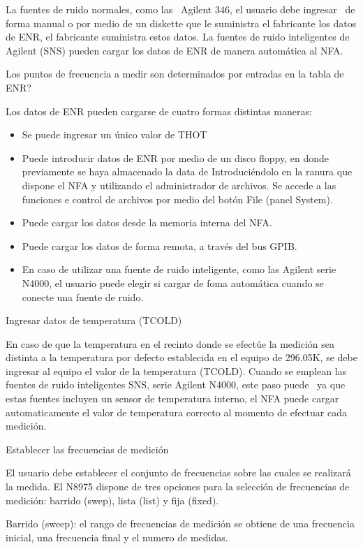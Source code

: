 {	La fuentes de ruido normales, como las \ Agilent 346, el usuario debe ingresar \ de forma manual o por medio de un
	diskette que le suministra el fabricante los datos de ENR, el fabricante suministra estos datos. La fuentes de ruido
	inteligentes de Agilent (SNS) pueden cargar los datos de ENR de manera automática al NFA.
	
	Los puntos de frecuencia a medir son determinados por entradas en la tabla de ENR?
	
	Los datos de ENR pueden cargarse de cuatro formas distintas maneras:
	
	\begin{itemize}
		\item Se puede ingresar un único valor de THOT
		\item Puede introducir datos de ENR por medio de un disco floppy, en donde previamente se haya almacenado la data de
		Introduciéndolo en la ranura que dispone el NFA y utilizando el administrador de archivos. Se accede a las funciones e
		control de archivos por medio del botón File (panel System).
		\item Puede cargar los datos desde la memoria interna del NFA. 
		\item Puede cargar los datos de forma remota, a través del bus GPIB. 
		\item En caso de utilizar una fuente de ruido inteligente, como las Agilent serie N4000, el usuario puede elegir si
		cargar de foma automática cuando se conecte una fuente de ruido.
	\end{itemize}
	Ingresar datos de temperatura (TCOLD)
	
	En caso de que la temperatura en el recinto donde se efectúe la medición sea distinta a la temperatura por defecto
	establecida en el equipo de 296.05K, se debe ingresar al equipo el valor de la temperatura (TCOLD). Cuando se emplean
	las fuentes de ruido inteligentes SNS, serie Agilent N4000, este paso puede \ ya que estas fuentes incluyen un sensor
	de temperatura interno, el NFA puede cargar automaticamente el valor de temperatura correcto al momento de efectuar
	cada medición.
	
	Establecer las frecuencias de medición
	
	El usuario debe establecer el conjunto de frecuencias sobre las cuales se realizará la medida. El N8975 dispone de tres
	opciones para la selección de frecuencias de medición: barrido (swep), lista (list) y fija (fixed).
	
	Barrido (sweep): el rango de frecuencias de medición se obtiene de una frecuencia inicial, una frecuencia final y el
	numero de medidas.
	
}
